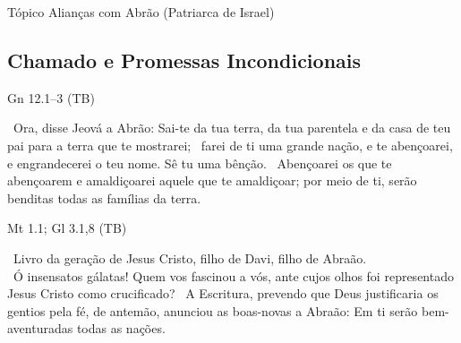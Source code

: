 \documentclass[12pt,aspectratio=169]{beamer}
\newcommand{\ver}[1]{%
    \raisebox{0.50ex}{%
        \scalebox{1.1}{%
            \pmb{\textbf{\textcolor{BSpbg}{#1}}}%
        }%
    }%
}
\newcommand{\QUOTE}[1]{%
    \par\noindent\hspace*{0.05\linewidth}%
    \begin{minipage}{0.9\linewidth}%
        \linespread{1.35}\large{#1}%
    \end{minipage}%
}
\newcommand{\RED}[1]{{\textcolor{TXred}{#1}}}
\newcommand{\YEL}[1]{{\textcolor{TXyel}{#1}}}
\newcommand{\GRE}[1]{{\textcolor{TXgre}{#1}}}
\newcommand{\CYA}[1]{{\textcolor{TXcya}{#1}}}
\newcommand{\BLU}[1]{{\textcolor{TXblu}{#1}}}
\newcommand{\MAG}[1]{{\textcolor{TXmag}{#1}}}
\newcommand{\BRI}[1]{{\textcolor{BSpbg}{#1}}}   %
\begin{document}
    \begin{frame}
        \par\noindent\hspace*{0.05\linewidth}%
        \begin{minipage}{0.9\linewidth}%
            \large%
            \begin{alertblock}{Tópico}
                Alianças com Abrão (Patriarca de Israel)
            \end{alertblock}
        \end{minipage}%
    \end{frame}

    \subsection{Chamado e Promessas \BRI{Incondicionais}}

    \begin{frame}{Gn 12.1--3 (TB)}
        \QUOTE{%
            \ver{1}~Ora, disse Jeová a Abrão: Sai-te da tua terra, da tua parentela e da casa de
            teu pai para a terra que te mostrarei;
            \ver{2}~farei de ti uma \YEL{grande nação}, e te \GRE{abençoarei}, e
            \CYA{engrandecerei} o teu nome.  \GRE{Sê tu uma bênção}.
            \ver{3}~\BLU{Abençoarei os que te abençoarem} e \RED{amaldiçoarei aquele que te
            amaldiçoar}; por meio de ti, serão \MAG{benditas todas as famílias da terra}.
        }
    \end{frame}

    \begin{frame}{Mt 1.1; Gl 3.1,8 (TB)}
        \QUOTE{%
            \ver{Mt 1.1}~Livro da geração de \MAG{Jesus Cristo}, filho de Davi, \YEL{filho de
            Abraão}.
            \\[\medskipamount]
            \ver{Gl 3.1}~Ó insensatos gálatas! Quem vos fascinou a vós, ante cujos olhos foi
            representado \MAG{Jesus Cristo} como crucificado?
            \ver{Gl 3.8}~A \YEL{Escritura}, \YEL{prevendo} que Deus justificaria os gentios pela
            fé, \YEL{de antemão, anunciou} as boas-novas a Abraão: \MAG{Em ti serão
            bem-aventuradas todas as nações}.
        }
    \end{frame}
\end{document}
